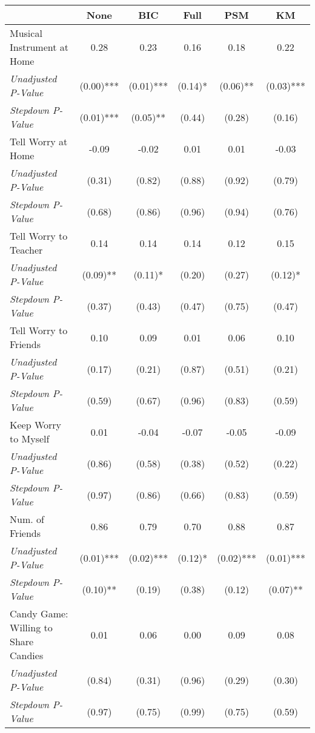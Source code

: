 \begin{tabular}{l c c c c c}
\toprule
 & None & BIC & Full & PSM & KM \\
\midrule
Musical Instrument at Home & 0.28 & 0.23 & 0.16 & 0.18 & 0.22 \\
\quad \textit{Unadjusted P-Value} & (0.00)*** & (0.01)*** & (0.14)* & (0.06)** & (0.03)*** \\
\quad \textit{Stepdown P-Value} & (0.01)*** & (0.05)** & (0.44) & (0.28) & (0.16) \\
Tell Worry at Home & -0.09 & -0.02 & 0.01 & 0.01 & -0.03 \\
\quad \textit{Unadjusted P-Value} & (0.31) & (0.82) & (0.88) & (0.92) & (0.79) \\
\quad \textit{Stepdown P-Value} & (0.68) & (0.86) & (0.96) & (0.94) & (0.76) \\
Tell Worry to Teacher & 0.14 & 0.14 & 0.14 & 0.12 & 0.15 \\
\quad \textit{Unadjusted P-Value} & (0.09)** & (0.11)* & (0.20) & (0.27) & (0.12)* \\
\quad \textit{Stepdown P-Value} & (0.37) & (0.43) & (0.47) & (0.75) & (0.47) \\
Tell Worry to Friends & 0.10 & 0.09 & 0.01 & 0.06 & 0.10 \\
\quad \textit{Unadjusted P-Value} & (0.17) & (0.21) & (0.87) & (0.51) & (0.21) \\
\quad \textit{Stepdown P-Value} & (0.59) & (0.67) & (0.96) & (0.83) & (0.59) \\
Keep Worry to Myself & 0.01 & -0.04 & -0.07 & -0.05 & -0.09 \\
\quad \textit{Unadjusted P-Value} & (0.86) & (0.58) & (0.38) & (0.52) & (0.22) \\
\quad \textit{Stepdown P-Value} & (0.97) & (0.86) & (0.66) & (0.83) & (0.59) \\
Num. of Friends & 0.86 & 0.79 & 0.70 & 0.88 & 0.87 \\
\quad \textit{Unadjusted P-Value} & (0.01)*** & (0.02)*** & (0.12)* & (0.02)*** & (0.01)*** \\
\quad \textit{Stepdown P-Value} & (0.10)** & (0.19) & (0.38) & (0.12) & (0.07)** \\
Candy Game: Willing to Share Candies & 0.01 & 0.06 & 0.00 & 0.09 & 0.08 \\
\quad \textit{Unadjusted P-Value} & (0.84) & (0.31) & (0.96) & (0.29) & (0.30) \\
\quad \textit{Stepdown P-Value} & (0.97) & (0.75) & (0.99) & (0.75) & (0.59) \\
\bottomrule
\end{tabular}
